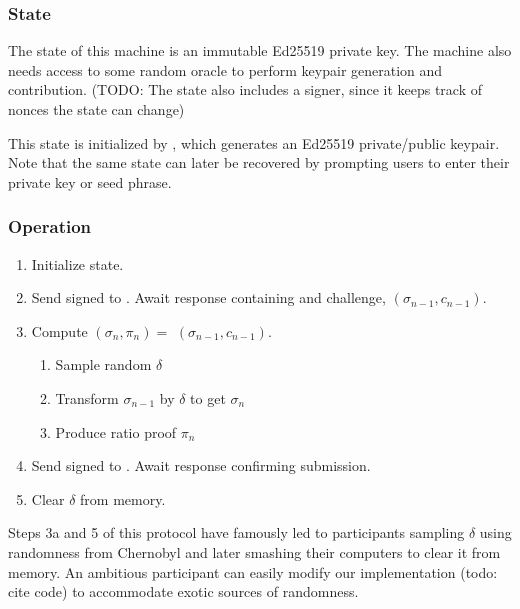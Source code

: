 \subsubsection*{State}
The state of this machine is an immutable Ed25519 private key. The machine also needs access to some random oracle to perform keypair generation and contribution. (TODO: The state also includes a signer, since it keeps track of nonces the state can change)

This state is initialized by \generatekeypair{}, which generates an Ed25519 private/public keypair. Note that the same state can later be recovered by prompting users to enter their private key or seed phrase.

\subsubsection*{Operation}

\begin{enumerate}
    \item Initialize state.
    \item Send signed \QueryRequest{} to \Coordinator{}. Await response containing \MpcState{} and challenge, $(\sigma_{n-1}, c_{n-1})$.
    \item Compute $(\sigma_n, \pi_n) = $ \contribute{}$(\sigma_{n-1}, c_{n-1})$.
    \begin{enumerate}
        \item Sample random $\delta$
        \item Transform $\sigma_{n-1}$ by $\delta$ to get $\sigma_n$
        \item Produce ratio proof $\pi_n$ 
    \end{enumerate}
    \item Send signed \UpdateRequest{} to \Coordinator{}. Await response confirming submission.
    \item Clear $\delta$ from memory.
\end{enumerate}

Steps 3a and 5 of this protocol have famously led to participants sampling $\delta$ using randomness from Chernobyl and later smashing their computers to clear it from memory. An ambitious participant can easily modify our implementation (todo: cite code) to accommodate exotic sources of randomness.